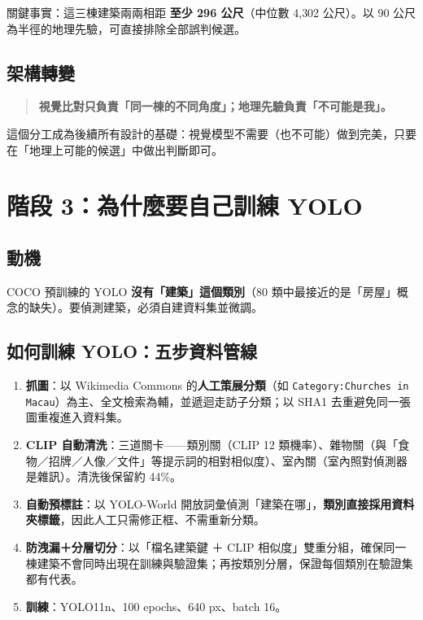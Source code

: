 \documentclass[11pt,a4paper,fontset=windows]{ctexart}
\begin{document}
\noindent 關鍵事實：這三棟建築兩兩相距 \textbf{至少 296 公尺}（中位數 4{,}302 公尺）。以 90 公尺為半徑的地理先驗，可直接排除全部誤判候選。

\subsection{架構轉變}
\begin{quote}
\textbf{視覺比對只負責「同一棟的不同角度」；地理先驗負責「不可能是我」。}
\end{quote}

\noindent 這個分工成為後續所有設計的基礎：視覺模型不需要（也不可能）做到完美，只要在「地理上可能的候選」中做出判斷即可。

\section{階段 3：為什麼要自己訓練 YOLO}

\subsection{動機}
COCO 預訓練的 YOLO \textbf{沒有「建築」這個類別}（80 類中最接近的是「房屋」概念的缺失）。要偵測建築，必須自建資料集並微調。

\subsection{如何訓練 YOLO：五步資料管線}
\begin{enumerate}[leftmargin=1.4em,itemsep=2pt]
  \item \textbf{抓圖}：以 Wikimedia Commons 的\textbf{人工策展分類}（如 \texttt{Category:Churches in Macau}）為主、全文檢索為輔，並遞迴走訪子分類；以 SHA1 去重避免同一張圖重複進入資料集。
  \item \textbf{CLIP 自動清洗}：三道關卡——類別關（CLIP 12 類機率）、雜物關（與「食物／招牌／人像／文件」等提示詞的相對相似度）、室內關（室內照對偵測器是雜訊）。清洗後保留約 44\%。
  \item \textbf{自動預標註}：以 YOLO-World 開放詞彙偵測「建築在哪」，\textbf{類別直接採用資料夾標籤}，因此人工只需修正框、不需重新分類。
  \item \textbf{防洩漏＋分層切分}：以「檔名建築鍵 ＋ CLIP 相似度」雙重分組，確保同一棟建築不會同時出現在訓練與驗證集；再按類別分層，保證每個類別在驗證集都有代表。
  \item \textbf{訓練}：YOLO11n、100 epochs、640 px、batch 16。
\end{enumerate}
\end{document}
